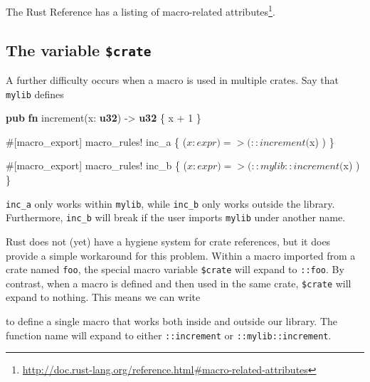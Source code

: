 \documentclass[a4paper,]{book}
\newenvironment{Shaded}{\begin{snugshade}}{\end{snugshade}}
\newcommand{\KeywordTok}[1]{\textcolor[rgb]{0.13,0.29,0.53}{\textbf{{#1}}}}
\newcommand{\DecValTok}[1]{\textcolor[rgb]{0.00,0.00,0.81}{{#1}}}
\newcommand{\OtherTok}[1]{\textcolor[rgb]{0.56,0.35,0.01}{{#1}}}
\newcommand{\NormalTok}[1]{{#1}}
\renewcommand{\href}[2]{#2\footnote{\url{#1}}}
\begin{document}
The Rust Reference has a
\href{http://doc.rust-lang.org/reference.html\#macro-related-attributes}{listing
of macro-related attributes}.

\subsection{\texorpdfstring{The variable
\texttt{\$crate}}{The variable \$crate}}\label{the-variable-crate}

A further difficulty occurs when a macro is used in multiple crates. Say
that \texttt{mylib} defines

\begin{Shaded}
\begin{Highlighting}[]
\KeywordTok{pub} \KeywordTok{fn} \NormalTok{increment(x: }\KeywordTok{u32}\NormalTok{) -> }\KeywordTok{u32} \NormalTok{\{}
    \NormalTok{x + }\DecValTok{1}
\NormalTok{\}}

\OtherTok{#[}\NormalTok{macro_export}\OtherTok{]}
\OtherTok{macro_rules!} \NormalTok{inc_a \{}
    \NormalTok{($x:expr) => ( ::increment($x) )}
\NormalTok{\}}

\OtherTok{#[}\NormalTok{macro_export}\OtherTok{]}
\OtherTok{macro_rules!} \NormalTok{inc_b \{}
    \NormalTok{($x:expr) => ( ::mylib::increment($x) )}
\NormalTok{\}}
\end{Highlighting}
\end{Shaded}

\texttt{inc\_a} only works within \texttt{mylib}, while \texttt{inc\_b}
only works outside the library. Furthermore, \texttt{inc\_b} will break
if the user imports \texttt{mylib} under another name.

Rust does not (yet) have a hygiene system for crate references, but it
does provide a simple workaround for this problem. Within a macro
imported from a crate named \texttt{foo}, the special macro variable
\texttt{\$crate} will expand to \texttt{::foo}. By contrast, when a
macro is defined and then used in the same crate, \texttt{\$crate} will
expand to nothing. This means we can write

\begin{Shaded}
\end{Shaded}

to define a single macro that works both inside and outside our library.
The function name will expand to either \texttt{::increment} or
\texttt{::mylib::increment}.
\end{document}
